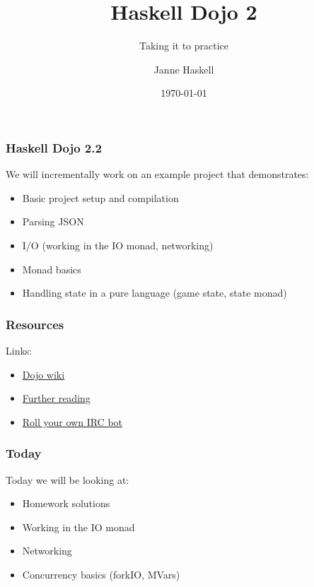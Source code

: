 \documentclass{beamer}
\title{Haskell Dojo 2}
\subtitle{Taking it to practice}
\date{\today}
\author{Janne Haskell}
\begin{document}
\frame{\titlepage}

\begin{frame}[fragile]

\frametitle{Haskell Dojo 2.2}

We will incrementally work on an example project that demonstrates:

\begin{itemize}
  \item Basic project setup and compilation
  \item Parsing JSON
  \item I/O (working in the IO monad, networking)
  \item Monad basics
  \item Handling state in a pure language (game state, state monad)
\end{itemize}

\end{frame}

\begin{frame}[fragile]
\frametitle{Resources}

Links:

\begin{itemize}
  \item \href{https://github.com/nurpax/haskell-dojo/wiki/Haskell-Dojo-\%232}{Dojo wiki}
  \item \href{https://github.com/nurpax/haskell-dojo/wiki/Further-reading}{Further reading}
  \item \href{http://www.haskell.org/haskellwiki/Roll_your_own_IRC_bot}{Roll your own IRC bot}
\end{itemize}

\end{frame}

\begin{frame}[fragile]

\frametitle{Today}

Today we will be looking at:

\begin{itemize}
  \item Homework solutions
  \item Working in the IO monad
  \item Networking
  \item Concurrency basics (forkIO, MVars)
\end{itemize}

\end{frame}
\end{document}
